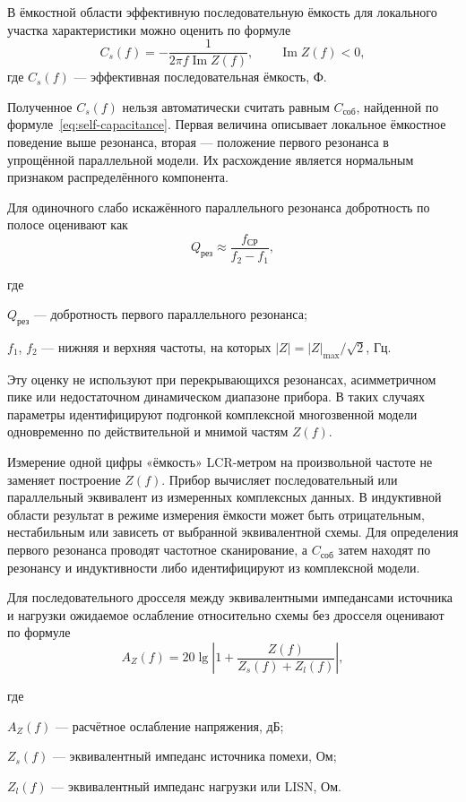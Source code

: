 \documentclass[14pt,a4paper]{extarticle}
\newenvironment{whereblock}
 {\par\noindent где\par
  \begin{list}{}{\setlength{\leftmargin}{12.5mm}
                  \setlength{\itemindent}{-12.5mm}
                  \setlength{\itemsep}{0pt}
                  \setlength{\parsep}{0pt}
                  \setlength{\topsep}{0pt}}}
 {\end{list}}
\newcommand{\whereitem}[2]{\item[] #1 --- #2}
\begin{document}
В ёмкостной области эффективную последовательную ёмкость для локального
участка характеристики можно оценить по формуле
\begin{equation}
 C_s(f)=
 -\frac{1}{2\pi f\operatorname{Im}Z(f)},
 \qquad \operatorname{Im}Z(f)<0,
 \label{eq:series-capacitance-from-z}
\end{equation}
где $C_s(f)$ --- эффективная последовательная ёмкость, Ф.

Полученное $C_s(f)$ нельзя автоматически считать равным
$C_{\text{соб}}$, найденной по формуле~\eqref{eq:self-capacitance}. Первая
величина описывает локальное ёмкостное поведение выше резонанса, вторая ---
положение первого резонанса в упрощённой параллельной модели. Их расхождение
является нормальным признаком распределённого компонента.

Для одиночного слабо искажённого параллельного резонанса добротность по
полосе оценивают как
\begin{equation}
 Q_{\text{рез}}\approx
 \frac{f_{\text{СР}}}{f_2-f_1},
 \label{eq:resonance-quality-bandwidth}
\end{equation}
\begin{whereblock}
\whereitem{$Q_{\text{рез}}$}{добротность первого параллельного резонанса;}
\whereitem{$f_1$, $f_2$}{нижняя и верхняя частоты, на которых
$|Z|=|Z|_{\max}/\sqrt{2}$, Гц.}
\end{whereblock}

Эту оценку не используют при перекрывающихся резонансах, асимметричном пике
или недостаточном динамическом диапазоне прибора. В таких случаях параметры
идентифицируют подгонкой комплексной многозвенной модели одновременно по
действительной и мнимой частям $Z(f)$.

Измерение одной цифры «ёмкость» LCR-метром на произвольной частоте не
заменяет построение $Z(f)$. Прибор вычисляет последовательный или параллельный
эквивалент из измеренных комплексных данных. В индуктивной области результат
в режиме измерения ёмкости может быть отрицательным, нестабильным или зависеть
от выбранной эквивалентной схемы. Для определения первого резонанса проводят
частотное сканирование, а $C_{\text{соб}}$ затем находят по резонансу и
индуктивности либо идентифицируют из комплексной модели.

Для последовательного дросселя между эквивалентными импедансами источника и
нагрузки ожидаемое ослабление относительно схемы без дросселя оценивают по
формуле
\begin{equation}
 A_Z(f)=20\lg
 \left|
 1+\frac{Z(f)}{Z_s(f)+Z_l(f)}
 \right|,
 \label{eq:series-insertion-loss}
\end{equation}
\begin{whereblock}
\whereitem{$A_Z(f)$}{расчётное ослабление напряжения, дБ;}
\whereitem{$Z_s(f)$}{эквивалентный импеданс источника помехи, Ом;}
\whereitem{$Z_l(f)$}{эквивалентный импеданс нагрузки или LISN, Ом.}
\end{whereblock}
\end{document}
